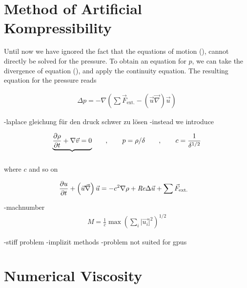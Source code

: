 \section{Method of Artificial Kompressibility}

Until now we have ignored the fact that the equations of motion (), cannot directly be solved for the pressure.
To obtain an equation for $p$, we can take the divergence of equation (), and apply the continuity equation.
The resulting equation for the pressure reads

\begin{align}
    \Delta p =  -\nabla \left( \sum \vec{F}_{\text{ext.}} - (\vec{u} \vec{\nabla}) \vec{u}\right)
\end{align}

-laplace gleichung für den druck schwer zu lösen
-instead we introduce

\begin{align}
    \underbrace{\pdn[\rho]{t} +  \nabla \vec{v} = 0}_{\label{bla}} \qquad , \qquad p =\rho/\delta \qquad, \qquad c=\frac{1}{\delta^{1/2}}
\end{align}

where $c$ and so on

\begin{align}
    \label{numerik:nsac}
    \pdn[u]{t} + \left(\vec{u} \vec{\nabla}\right) \vec{u} &= -c^2\nabla\rho + \Rey \Delta \vec{u}+\sum \vec{F}_{\text{ext.}}
\end{align}

-machnumber
\begin{align}
    M = \frac{1}{c}\max\left(\sum_i |\vec{u_i}]^2\right)^{1/2}
\end{align}


-stiff problem
-implizit methods
-problem not suited for gpus
\section{Numerical Viscosity}

\begin{align}
 \label{NUMERIC:NUMVIS}
\end{align}

